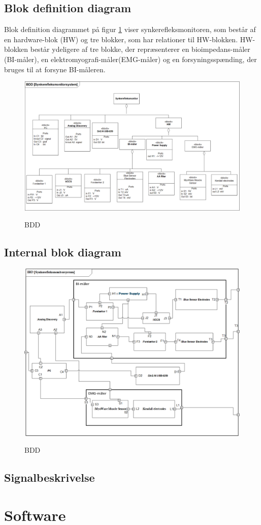 \section{Blok definition diagram}

Blok definition diagrammet på figur \ref{figbdd} viser synkerefleksmonitoren, som består af en hardware-blok (HW) og tre blokker, som har relationer til HW-blokken. HW-blokken består ydeligere af tre blokke, der repræsenterer en bioimpedans-måler (BI-måler), en elektromyografi-måler(EMG-måler) og en forsyningsspænding, der bruges til at forsyne BI-måleren.  

\begin{figure}[H] 
\centering
{\includegraphics[width=\linewidth]
{Figure/BDD}}
\caption{BDD}
\label{figbdd}
\end{figure}

\section{Internal blok diagram}

\begin{figure}[H]
\centering
{\includegraphics[width=\linewidth]
{Figure/IBD}}
\caption{BDD}
\label{fig:BDD}
\end{figure}

\section{Signalbeskrivelse}


\chapter{Software} \label{swafsnit}

\citep{Aroom2009}




